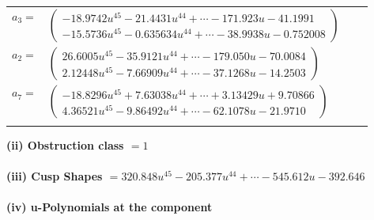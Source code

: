\documentclass[1p]{elsarticle_modified}
\theoremstyle{definition}
\begin{document}
\begin{tabular}{m{7pt} m{180pt} m{7pt} m{180pt} }
\flushright $a_{3}=$&$\begin{pmatrix}-18.9742 u^{45}-21.4431 u^{44}+\cdots-171.923 u-41.1991\\-15.5736 u^{45}-0.635634 u^{44}+\cdots-38.9938 u-0.752008\end{pmatrix}$ \\
\flushright $a_{2}=$&$\begin{pmatrix}26.6005 u^{45}-35.9121 u^{44}+\cdots-179.050 u-70.0084\\2.12448 u^{45}-7.66909 u^{44}+\cdots-37.1268 u-14.2503\end{pmatrix}$ \\
\flushright $a_{7}=$&$\begin{pmatrix}-18.8296 u^{45}+7.63038 u^{44}+\cdots+3.13429 u+9.70866\\4.36521 u^{45}-9.86492 u^{44}+\cdots-62.1078 u-21.9710\end{pmatrix}$\\&\end{tabular}
\flushleft \textbf{(ii) Obstruction class $= 1$}\\~\\
\flushleft \textbf{(iii) Cusp Shapes $= 320.848 u^{45}-205.377 u^{44}+\cdots-545.612 u-392.646$}\\~\\
\newpage\renewcommand{\arraystretch}{1}
\flushleft \textbf{(iv) u-Polynomials at the component}\newline \\
\end{document}
